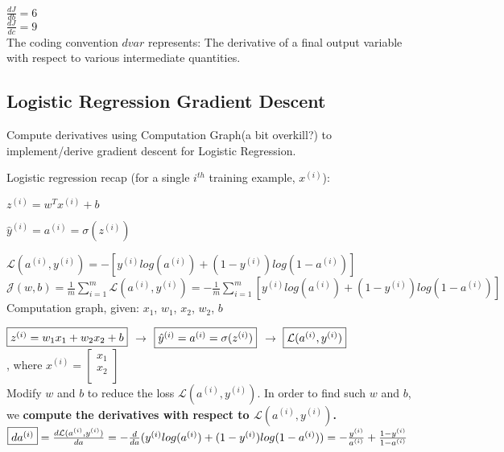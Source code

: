 \documentclass{article}
\begin{document}
$\displaystyle \frac{dJ}{db} = 6$\\

$\displaystyle \frac{dJ}{dc} = 9$\\

The coding convention $dvar$ represents:
The derivative of a final output variable with respect to various intermediate quantities.

\newpage
\subsection{Logistic Regression Gradient Descent}


Compute derivatives using Computation Graph(a bit overkill?) to implement/derive gradient descent for Logistic Regression.

Logistic regression recap (for a single $i^{th}$ training example, $x^{(i)}$):

$z^{(i)} = w^{T}x^{(i)} +b$

$\hat{y}^{(i)} = a^{(i)} = \sigma(z^{(i)})$

$\mathcal{L}(a^{(i)},y^{(i)}) = -[y^{(i)}log(a^{(i)}) + (1-y^{(i)})log(1-a^{(i)})]$\\

$\mathcal{J}(w,b) = \frac{1}{m}\sum_{i=1}^{m}\mathcal{L}(a^{(i)},y^{(i)}) = -\frac{1}{m}\sum_{i=1}^{m} [y^{(i)}log(a^{(i)}) + (1-y^{(i)})log(1-a^{(i)})]$\\

Computation graph, given: $x_1$, $w_1$, $x_2$, $w_2$, $b$

$\fbox{$z^{(i)} = w_1 x_1 + w_2 x_2 +b$}$
$\rightarrow$
$\fbox{$\hat{y}^{(i)} = a^{(i)} = \sigma(z^{(i)})$}$
$\rightarrow$
$\fbox{$\mathcal{L}(a^{(i)},y^{(i)})$}$\\

, where $x^{(i)}= \begin{bmatrix}
x_1\\
x_2\\
\end{bmatrix}$\\

Modify $w$ and $b$ to reduce the loss $\mathcal{L}(a^{(i)},y^{(i)})$. In order to find such $w$ and $b$, we \textbf{compute the derivatives with respect to $\mathcal{L}(a^{(i)},y^{(i)})$.}\\

$\fbox{$da^{(i)}$}= \frac{d\mathcal{L}(a^{(i)},y^{(i)})}{da} = -\frac{d}{da} (y^{(i)}log(a^{(i)}) + (1-y^{(i)})log(1-a^{(i)})) = -\frac{y^{(i)}}{a^{(i)}} + \frac{1-y^{(i)}}{1-a^{(i)}}$\\
\end{document}
